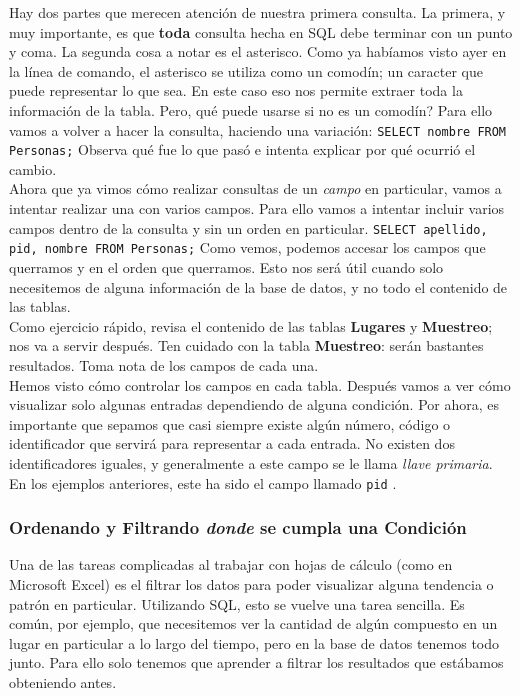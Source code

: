 \documentclass[10pt,letterpaper]{article}
\newcommand{\inlinecode}[1]{
\colorbox{light-gray}{\texttt{#1}}
}
\begin{document}
Hay dos partes que merecen atenci\'on de nuestra primera consulta. La primera, y muy importante, es que \textbf{toda} consulta hecha en SQL debe terminar con un punto y coma. La segunda cosa a notar es el asterisco. Como ya hab\'iamos visto ayer en la l\'inea de comando, el asterisco se utiliza como un comod\'in; un caracter que puede representar lo que sea. En este caso eso nos permite extraer toda la informaci\'on de la tabla. Pero, qu\'e puede usarse si no es un comod\'in? Para ello vamos a volver a hacer la consulta, haciendo una variaci\'on: \inlinecode{SELECT nombre FROM Personas;} Observa qu\'e fue lo que pas\'o e intenta explicar por qu\'e ocurri\'o el cambio.\\

Ahora que ya vimos c\'omo realizar consultas de un \emph{campo} en particular, vamos a intentar realizar una con varios campos. Para ello vamos a intentar incluir varios campos dentro de la consulta y sin un orden en particular. \inlinecode{SELECT apellido, pid, nombre FROM Personas;} Como vemos, podemos accesar los campos que querramos y en el orden que querramos. Esto nos ser\'a \'util cuando solo necesitemos de alguna informaci\'on de la base de datos, y no todo el contenido de las tablas.\\

Como ejercicio r\'apido, revisa el contenido de las tablas \textbf{Lugares} y \textbf{Muestreo}; nos va a servir despu\'es. Ten cuidado con la tabla \textbf{Muestreo}: ser\'an bastantes resultados. Toma nota de los campos de cada una.\\

Hemos visto c\'omo controlar los campos en cada tabla. Despu\'es vamos a ver c\'omo visualizar solo algunas entradas dependiendo de alguna condici\'on. Por ahora, es importante que sepamos que casi siempre existe alg\'un n\'umero, c\'odigo o identificador que servir\'a para representar a cada entrada. No existen dos identificadores iguales, y generalmente a este campo se le llama \emph{llave primaria}. En los ejemplos anteriores, este ha sido el campo llamado \inlinecode{pid}.

\subsubsection{Ordenando y Filtrando \emph{donde} se cumpla una Condici\'on}
Una de las tareas complicadas al trabajar con hojas de c\'alculo (como en Microsoft Excel) es el filtrar los datos para poder visualizar alguna tendencia o patr\'on en particular. Utilizando SQL, esto se vuelve una tarea sencilla. Es com\'un, por ejemplo, que necesitemos ver la cantidad de alg\'un compuesto en un lugar en particular a lo largo del tiempo, pero en la base de datos tenemos todo junto. Para ello solo tenemos que aprender a filtrar los resultados que est\'abamos obteniendo antes.\\
\end{document}
